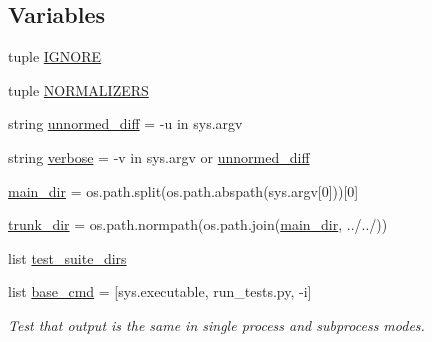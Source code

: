 \subsection*{Variables}
\begin{DoxyCompactItemize}
\item 
tuple \hyperlink{namespacepygame_1_1tests_1_1run__tests____tests_1_1run__tests____test_a3ba577a582a7b7dc94d525f27cc14307}{I\+G\+N\+O\+RE}
\item 
tuple \hyperlink{namespacepygame_1_1tests_1_1run__tests____tests_1_1run__tests____test_a8708da5106de8658106ffb6a957ab218}{N\+O\+R\+M\+A\+L\+I\+Z\+E\+RS}
\item 
string \hyperlink{namespacepygame_1_1tests_1_1run__tests____tests_1_1run__tests____test_a9aab2705df0f009bbf08eb8c7c82ad37}{unnormed\+\_\+diff} = \textquotesingle{}-\/u\textquotesingle{} in sys.\+argv
\item 
string \hyperlink{namespacepygame_1_1tests_1_1run__tests____tests_1_1run__tests____test_ab81e427887042d3a0ed92cd48c8383f9}{verbose} = \textquotesingle{}-\/v\textquotesingle{} in sys.\+argv or \hyperlink{namespacepygame_1_1tests_1_1run__tests____tests_1_1run__tests____test_a9aab2705df0f009bbf08eb8c7c82ad37}{unnormed\+\_\+diff}
\item 
\hyperlink{namespacepygame_1_1tests_1_1run__tests____tests_1_1run__tests____test_a6ec6f11b2296b88fc58a73b060fd72a6}{main\+\_\+dir} = os.\+path.\+split(os.\+path.\+abspath(sys.\+argv\mbox{[}0\mbox{]}))\mbox{[}0\mbox{]}
\item 
\hyperlink{namespacepygame_1_1tests_1_1run__tests____tests_1_1run__tests____test_ac47439728c7bd48859ece030bf6e3d52}{trunk\+\_\+dir} = os.\+path.\+normpath(os.\+path.\+join(\hyperlink{namespacepygame_1_1tests_1_1run__tests____tests_1_1run__tests____test_a6ec6f11b2296b88fc58a73b060fd72a6}{main\+\_\+dir}, \textquotesingle{}../../\textquotesingle{}))
\item 
list \hyperlink{namespacepygame_1_1tests_1_1run__tests____tests_1_1run__tests____test_aecd44a4a4caf0f10a8d66472a84132ac}{test\+\_\+suite\+\_\+dirs}
\item 
list \hyperlink{namespacepygame_1_1tests_1_1run__tests____tests_1_1run__tests____test_ae4eefb50d5c814a1cf4f82665dc99b76}{base\+\_\+cmd} = \mbox{[}sys.\+executable, \textquotesingle{}run\+\_\+tests.\+py\textquotesingle{}, \textquotesingle{}-\/i\textquotesingle{}\mbox{]}
\begin{DoxyCompactList}\small\item\em Test that output is the same in single process and subprocess modes. \end{DoxyCompactList}\item 

\end{DoxyCompactItemize}

